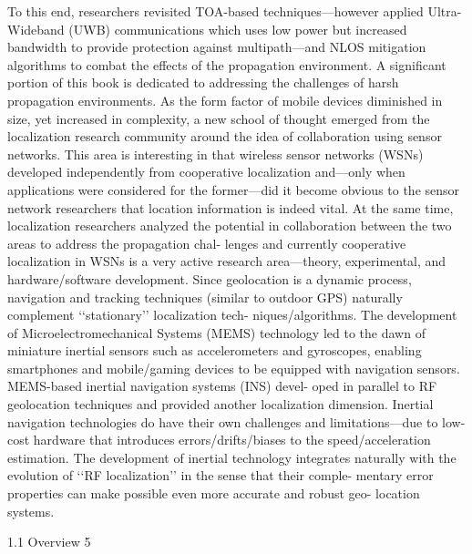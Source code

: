 To this end, researchers revisited TOA-based techniques—however applied Ultra-
Wideband (UWB) communications which uses low power but increased bandwidth
to provide protection against multipath—and NLOS mitigation algorithms to
combat the effects of the propagation environment. A significant portion of this book
is dedicated to addressing the challenges of harsh propagation environments.
As the form factor of mobile devices diminished in size, yet increased in
complexity, a new school of thought emerged from the localization research
community around the idea of collaboration using sensor networks. This area is
interesting in that wireless sensor networks (WSNs) developed independently from
cooperative localization and—only when applications were considered for the
former—did it become obvious to the sensor network researchers that location
information is indeed vital. At the same time, localization researchers analyzed the
potential in collaboration between the two areas to address the propagation chal-
lenges and currently cooperative localization in WSNs is a very active research
area—theory, experimental, and hardware/software development.
Since geolocation is a dynamic process, navigation and tracking techniques
(similar to outdoor GPS) naturally complement ‘‘stationary’’ localization tech-
niques/algorithms. The development of Microelectromechanical Systems (MEMS)
technology led to the dawn of miniature inertial sensors such as accelerometers
and gyroscopes, enabling smartphones and mobile/gaming devices to be equipped
with navigation sensors. MEMS-based inertial navigation systems (INS) devel-
oped in parallel to RF geolocation techniques and provided another localization
dimension. Inertial navigation technologies do have their own challenges and
limitations—due to low-cost hardware that introduces errors/drifts/biases to the
speed/acceleration estimation. The development of inertial technology integrates
naturally with the evolution of ‘‘RF localization’’ in the sense that their comple-
mentary error properties can make possible even more accurate and robust geo-
location systems.

1.1 Overview 5


